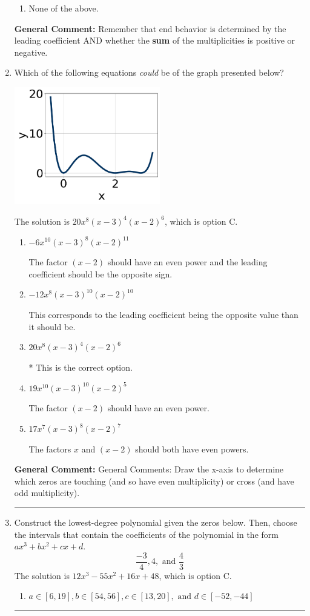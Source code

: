 \documentclass{extbook}[14pt]
\newcommand{\litem}[1]{\item #1

\rule{\textwidth}{0.4pt}}
\begin{document}
\begin{enumerate}
{\begin{enumerate}[label=\Alph*.]
\begin{multicols}{2}
\end{multicols}\item None of the above.\end{enumerate}
\textbf{General Comment:} Remember that end behavior is determined by the leading coefficient AND whether the \textbf{sum} of the multiplicities is positive or negative.
}
\litem{
Which of the following equations \textit{could} be of the graph presented below?

\begin{center}
    \includegraphics[width=0.5\textwidth]{../Figures/polyGraphToFunctionCopyB.png}
\end{center}


The solution is \( 20x^{8} (x - 3)^{4} (x - 2)^{6} \), which is option C.\begin{enumerate}[label=\Alph*.]
\item \( -6x^{10} (x - 3)^{8} (x - 2)^{11} \)

The factor $(x - 2)$ should have an even power and the leading coefficient should be the opposite sign.
\item \( -12x^{8} (x - 3)^{10} (x - 2)^{10} \)

This corresponds to the leading coefficient being the opposite value than it should be.
\item \( 20x^{8} (x - 3)^{4} (x - 2)^{6} \)

* This is the correct option.
\item \( 19x^{10} (x - 3)^{10} (x - 2)^{5} \)

The factor $(x - 2)$ should have an even power.
\item \( 17x^{7} (x - 3)^{8} (x - 2)^{7} \)

The factors $x$ and $(x - 2)$ should both have even powers.
\end{enumerate}

\textbf{General Comment:} General Comments: Draw the x-axis to determine which zeros are touching (and so have even multiplicity) or cross (and have odd multiplicity).
}
\litem{
Construct the lowest-degree polynomial given the zeros below. Then, choose the intervals that contain the coefficients of the polynomial in the form $ax^3+bx^2+cx+d$.
\[ \frac{-3}{4}, 4, \text{ and } \frac{4}{3} \]The solution is \( 12x^{3} -55 x^{2} +16 x + 48 \), which is option C.\begin{enumerate}[label=\Alph*.]
\item \( a \in [6, 19], b \in [54, 56], c \in [13, 20], \text{ and } d \in [-52, -44] \)


\end{enumerate}}
\end{enumerate}
\end{document}

